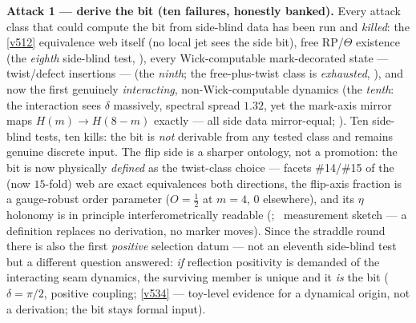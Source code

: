 \smallskip\noindent\textbf{Attack 1 --- derive the bit (ten failures, honestly banked).} Every
attack class that could compute the bit from side-blind data has been run and \emph{killed}: the
\vref{v512} equivalence web itself (no local jet sees the side bit), free RP/$\Theta$ existence
(the \emph{eighth} side-blind test, ), every Wick-computable
mark-decorated state --- twist/defect insertions --- (the \emph{ninth}; the free-plus-twist class
is \emph{exhausted}, ), and now the first genuinely
\emph{interacting}, non-Wick-computable dynamics (the \emph{tenth}: the interaction sees $\delta$
massively, spectral spread $1.32$, yet the mark-axis mirror maps $H(m)\to H(8-m)$ exactly ---
all side data mirror-equal; ). Ten side-blind tests,
ten kills: the bit is \emph{not} derivable from any tested class and remains genuine discrete
input. The flip side is a sharper ontology, not a promotion: the bit is now physically
\emph{defined} as the twist-class choice --- facets \#14/\#15 of the (now $15$-fold) web are
exact equivalences both directions, the flip-axis fraction is a gauge-robust order parameter
($O=\tfrac12$ at $m=4$, $0$ elsewhere), and its $\eta$ holonomy is in principle
interferometrically readable (; \mC\
measurement sketch --- a definition replaces no derivation, no marker moves). Since the straddle
round there is also the first \emph{positive} selection datum --- not an eleventh side-blind
test but a different question answered: \emph{if} reflection positivity is demanded of the
interacting seam dynamics, the surviving member is unique and it \emph{is} the bit
($\delta=\pi/2$, positive coupling; \vref{v534} --- toy-level evidence for a dynamical origin,
not a derivation; the bit stays formal input).

